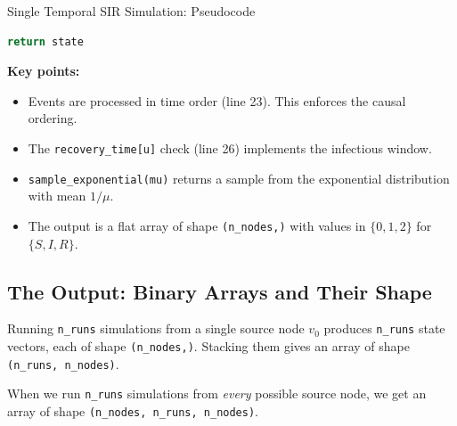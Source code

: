 \begin{codewalk}{Single Temporal SIR Simulation: Pseudocode}
\begin{lstlisting}[language=Python]
    return state
\end{lstlisting}
\textbf{Key points:}
\begin{itemize}[noitemsep]
    \item Events are processed in time order (line 23). This enforces the causal ordering.
    \item The \texttt{recovery\_time[u]} check (line 26) implements the infectious window.
    \item \texttt{sample\_exponential(mu)} returns a sample from the exponential distribution with mean $1/\mu$.
    \item The output is a flat array of shape \texttt{(n\_nodes,)} with values in $\{0, 1, 2\}$ for $\{S, I, R\}$.
\end{itemize}
\end{codewalk}

\subsection{The Output: Binary Arrays and Their Shape}

Running \texttt{n\_runs} simulations from a single source node $v_0$ produces \texttt{n\_runs} state vectors, each of shape \texttt{(n\_nodes,)}. Stacking them gives an array of shape \texttt{(n\_runs, n\_nodes)}.

When we run \texttt{n\_runs} simulations from \emph{every} possible source node, we get an array of shape \texttt{(n\_nodes, n\_runs, n\_nodes)}.

